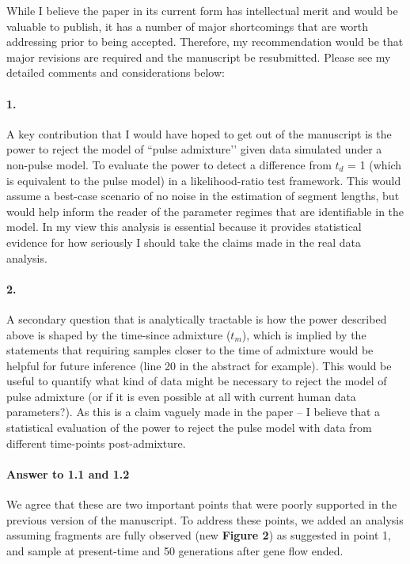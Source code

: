 \documentclass[11pt]{article}
\let\oldparagraph\paragraph
\renewcommand{\paragraph}[1]{\oldparagraph{#1}\mbox{}}
\begin{document}
While I believe the paper in its current form has intellectual merit and would be valuable to publish, it has a number of major shortcomings that are worth addressing prior to being accepted. Therefore, my recommendation would be that major revisions are required and the manuscript be resubmitted. Please see my detailed comments and considerations below: 

\paragraph{1.}
A key contribution that I would have hoped to get out of the manuscript is the power to reject the model of ``pulse admixture’’ given data simulated under a non-pulse model. To evaluate the power to detect a difference from $t_d$ = 1 (which is equivalent to the pulse model) in a likelihood-ratio test framework. This would assume a best-case scenario of no noise in the estimation of segment lengths, but would help inform the reader of the parameter regimes that are identifiable in the model. In my view this analysis is essential because it provides statistical evidence for how seriously I should take the claims made in the real data analysis.

\paragraph{2.}
A secondary question that is analytically tractable is how the power described above is shaped by the time-since admixture ($t_m$), which is implied by the statements that requiring samples closer to the time of admixture would be helpful for future inference (line 20 in the abstract for example). This would be useful to quantify what kind of data might be necessary to reject the model of pulse admixture (or if it is even possible at all with current human data parameters?). As this is a claim vaguely made in the paper – I believe that a statistical evaluation of the power to reject the pulse model with data from different time-points post-admixture. 

\paragraph{Answer to 1.1 and 1.2}
We agree that these are two important points that were poorly supported in the previous version of the manuscript. To address these points, we added an analysis assuming fragments are fully observed (new \textbf{Figure 2}) as suggested in point 1, and sample at present-time and 50 generations after gene flow ended.
\end{document}
